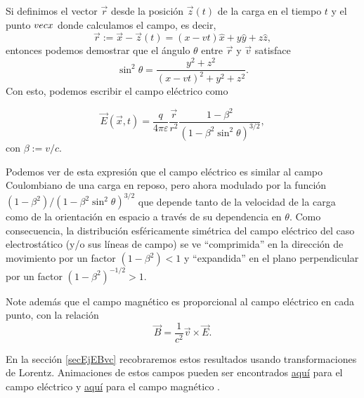 Si definimos el vector $\vec{r}$ desde la posición $\vec{z}(t)$ de la carga en el tiempo $t$ y el punto $\\vec{x}$ donde calculamos el campo, es decir,
\begin{equation}
\vec{r}:=\vec{x}-\vec{z}(t)=(x-vt)\hat{x}+y\hat{y}+z\hat{z},
\end{equation}
entonces podemos demostrar que el ángulo $\theta$ entre $\vec{r}$ y $\vec{v}$ satisface
\begin{equation}
\sin^2\theta = \frac{y^2+z^2}{(x-vt)^2+y^2+z^2}.
\end{equation}
Con esto, podemos escribir el campo eléctrico como

\begin{equation}
\vec{E}(\vec{x},t) = \frac{q}{4\pi\varepsilon}\frac{\vec{r}}{r^2}\frac{1-\beta^2}{(1-\beta^2\sin^2\theta)^{3/2}},
\end{equation}
con $\beta:=v/c$.

Podemos ver de esta expresión que el campo eléctrico es similar al campo Coulombiano de una carga en reposo, pero ahora modulado por la función $(1-\beta^2)/{(1-\beta^2\sin^2\theta)^{3/2}}$ que depende tanto de la velocidad de la carga como de la orientación en espacio a través de su dependencia en $\theta$. Como consecuencia, la distribución esféricamente simétrica del campo eléctrico del caso electrostático (y/o sus líneas de campo) se ve ``comprimida'' en la dirección de movimiento por un factor $(1-\beta^2)<1$ y ``expandida'' en el plano perpendicular por un factor $(1-\beta^2)^{-1/2}>1$.

Note además que el campo magnético es proporcional al campo eléctrico en cada punto, con la relación
\begin{equation}
\vec{B} = \frac{1}{c^2}\vec{v}\times\vec{E}.
\end{equation}

En la sección \ref{secEjEBvc} recobraremos estos resultados usando transformaciones de Lorentz. Animaciones de estos campos pueden ser encontrados \href{http://web.mit.edu/viz/EM/visualizations/electrostatics/ElectricFieldConfigurations/MovingChargePosElec/movingChargePosElec.htm}{aquí} para el campo eléctrico y \href{http://web.mit.edu/viz/EM/visualizations/magnetostatics/MagneticFieldConfigurations/MovingChargePosMag/MovingChargePosMag.htm}{aquí} para el campo magnético \cite{MIT}.


